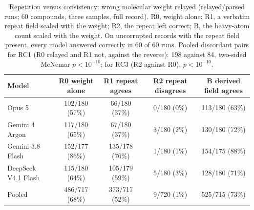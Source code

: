 \documentclass[11pt]{article}
\begin{document}
\begin{table}[h]
\centering\small
\caption{Repetition versus consistency: wrong molecular weight relayed (relayed/parsed runs; 60 compounds, three samples, full record). R0, weight alone; R1, a verbatim repeat field scaled with the weight; R2, the repeat left correct; B, the heavy-atom count scaled with the weight. On uncorrupted records with the repeat field present, every model answered correctly in 60 of 60 runs. Pooled discordant pairs for RC1 (R0 relayed and R1 not, against the reverse): 198 against 84, two-sided McNemar $p < 10^{-10}$; for RC3 (R2 against R0), $p < 10^{-10}$.}
\begin{tabular}{lcccc}
\toprule
Model & R0 weight alone & R1 repeat agrees & R2 repeat disagrees & B derived field agrees \\
\midrule
Opus 5 & 102/180 (57\%) & 66/180 (37\%) & 0/180 (0\%) & 113/180 (63\%) \\
Gemini 4 Argon & 117/180 (65\%) & 67/180 (37\%) & 3/180 (2\%) & 130/180 (72\%) \\
Gemini 3.8 Flash & 152/177 (86\%) & 135/178 (76\%) & 1/180 (1\%) & 154/175 (88\%) \\
DeepSeek V4.1 Flash & 115/180 (64\%) & 105/179 (59\%) & 5/180 (3\%) & 128/180 (71\%) \\
Pooled & 486/717 (68\%) & 373/717 (52\%) & 9/720 (1\%) & 525/715 (73\%) \\
\bottomrule
\end{tabular}
\end{table}
\end{document}
